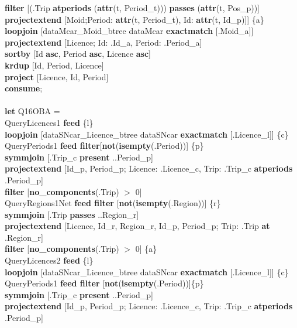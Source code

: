 \documentclass[a4paper]{article}
\newcommand{\op}[1]{\textbf{#1}}
\begin{document}
\begin{scriptsize}
\begin{tabbing}
\>\>\op{filter} [(.Trip \op{atperiods} (\op{attr}(t, Period\_t))) \op{passes} (\op{attr}(t, Pos\_p))]\\
\>\>\op{projectextend} [Moid;Period: \op{attr}(t, Period\_t), Id: \op{attr}(t, Id\_p)]] \{a\}\\
\>\op{loopjoin} [dataMcar\_Moid\_btree dataMcar \op{exactmatch} [.Moid\_a]]\\
\>\op{projectextend} [Licence; Id: .Id\_a, Period: .Period\_a]\\
\>\op{sortby} [Id \op{asc}, Period \op{asc}, Licence \op{asc}]\\
\>\op{krdup} [Id, Period, Licence]\\
\>\op{project} [Licence, Id, Period]\\
\op{consume};\\
\\
\op{let} Q16OBA =\\
\>QueryLicences1 \op{feed} \{l\}\\
\>\>\>\op{loopjoin} [dataSNcar\_Licence\_btree dataSNcar \op{exactmatch} [.Licence\_l]] \{c\}\\
\>\>QueryPeriods1 \op{feed filter}[\op{not}(\op{isempty}(.Period))] \{p\}\\
\>\>\op{symmjoin} [.Trip\_c \op{present} ..Period\_p]\\
\>\>\>\op{projectextend} [Id\_p, Period\_p; Licence: .Licence\_c, Trip: .Trip\_c \op{atperiods} .Period\_p]\\
\>\>\>\op{filter} [\op{no\_components}(.Trip) $>$ 0]\\
\>\>QueryRegions1Net \op{feed filter} [\op{not}(\op{isempty}(.Region))] \{r\}\\
\>\>\op{symmjoin} [.Trip \op{passes} ..Region\_r]\\
\>\>\op{projectextend} [Licence, Id\_r, Region\_r, Id\_p, Period\_p; Trip: .Trip \op{at} .Region\_r]\\
\>\>\op{filter} [\op{no\_components}(.Trip) $>$ 0] \{a\}\\
\>QueryLicences2 \op{feed} \{l\}\\
\>\>\>\op{loopjoin} [dataSNcar\_Licence\_btree dataSNcar \op{exactmatch} [.Licence\_l]] \{c\}\\
\>\>QueryPeriods1 \op{feed filter} [\op{not}(\op{isempty}(.Period))]\{p\}\\
\>\>\op{symmjoin} [.Trip\_c \op{present} ..Period\_p]\\
\>\>\>\op{projectextend} [Id\_p, Period\_p; Licence: .Licence\_c, Trip: .Trip\_c \op{atperiods} .Period\_p]\\

\end{tabbing}
\end{scriptsize}
\end{document}
